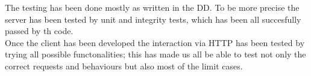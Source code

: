 The testing has been done mostly as written in the DD. To be more precise the server has been tested by unit and integrity tests, which has been all succesfully passed by th code.\\
Once the client has been developed the interaction via HTTP has been tested by trying all possible functonalities; this has made us all be able to test not only the correct requests and behaviours but also most of the limit cases.